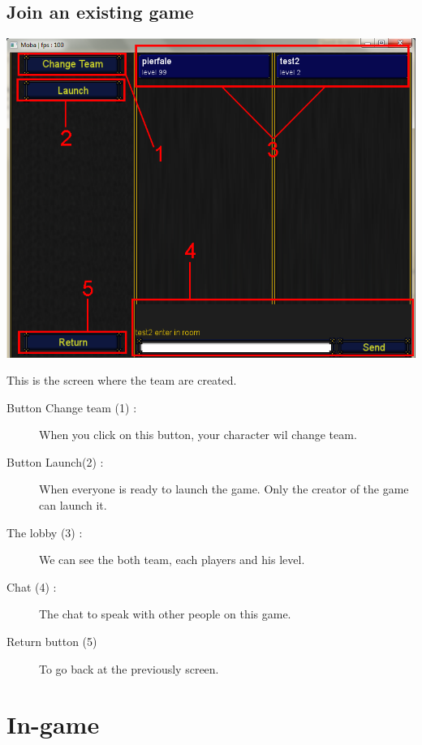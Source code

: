\documentclass{scrreprt}
\begin{document}
			  \section{Join an existing game}
			  \begin{center}
			  \includegraphics[scale=0.4]{lobby_screen.png}
			  \end{center}
			  This is the screen where the team are created.
			  \begin{description}
			  \item[Button Change team (1) :]{When you click on this button, your character wil change team.}
			  \item[Button Launch(2) :]{When everyone is ready to launch the game. Only the creator of the game can launch it.}
			  \item[The lobby (3) :]{We can see the both team, each players and his level.}
			  \item[Chat (4) :]{The chat to speak with other people on this game.}
			  \item[Return button (5)] {To go back at the previously screen.}
			  \end{description}
			  \chapter{In-game}
\end{document}
